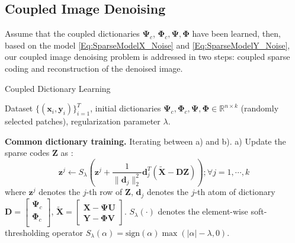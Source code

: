\documentclass{article}
\begin{document}
\vspace{-0.2cm}

\subsection{Coupled Image Denoising}
Assume that the coupled dictionaries $\boldsymbol{\Psi}_{c} $, $\boldsymbol{\Phi}_{c}, \boldsymbol{\Psi}, \boldsymbol{\Phi}$ have been learned, then, based on the model \eqref{Eq:SparseModelX_Noise} and \eqref{Eq:SparseModelY_Noise}, our coupled image denoising problem is addressed in two steps: coupled sparse coding and reconstruction of the denoised image.




\begin{algorithm}[t] %
	\caption{Coupled Dictionary Learning}
	\label{Alg:CoupledBCD}
		\begin{algorithmic}[1]	
			\renewcommand{\algorithmicrequire}{\textbf{Input:}}
			\renewcommand{\algorithmicensure}{\textbf{Output:}}
			\REQUIRE 
			Dataset 
			$\{(\mathbf{x}_i, \mathbf{y}_i) \}_{i=1}^T$, initial dictionaries $\boldsymbol{\Psi}_{c}, \boldsymbol{\Phi}_{c},\boldsymbol{\Psi}, \boldsymbol{\Phi} \in \mathbb{R}^{n \times k}$ (randomly selected patches), regularization parameter $\lambda$.
			
			
			\renewcommand{\algorithmicrequire}{\textbf{Optimization:}}
			\REQUIRE		
			\STATE
			\textbf{Common dictionary training.} Iterating between a) and b).
			\STATE
			a) Update the sparse codes $\mathbf{Z}$ as :
			\begin{equation*}
			\mathbf{z}^j \leftarrow S_\lambda\left( \mathbf{z}^j + \frac{1}{\|\mathbf{d}_j \|_2^2} \mathbf{d}_j^T (\widetilde{\mathbf{X}} - \mathbf{D} \mathbf{Z}) \right) ; \forall j=1,\cdots, k
			\end{equation*}
			where 
			$\mathbf{z}^j$ denotes the $j$-th row of $\mathbf{Z}$, $\mathbf{d}_j$ denotes the $j$-th atom of dictionary $\mathbf{D}	= 
			\begin{bmatrix}
			\boldsymbol{\Psi}_{c}  \\
			\boldsymbol{\Phi}_{c}  \\
			\end{bmatrix} $,
			$\widetilde{\mathbf{X}} = 
			\begin{bmatrix} 
			\mathbf{X} - \boldsymbol{\Psi} \mathbf{U} \\ 
			\mathbf{Y} -  \boldsymbol{\Phi} \mathbf{V}
			\end{bmatrix} $.
			$S_\lambda(\cdot)$ denotes the element-wise soft-thresholding operator
			$S_\lambda(\alpha) = \text{sign}(\alpha) \max(|\alpha|-\lambda, 0)$.
			

\end{algorithmic}
\end{algorithm}
\end{document}
